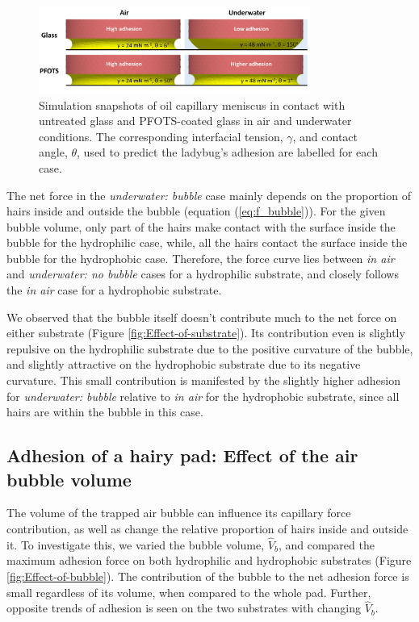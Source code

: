 \documentclass[vruler,JEB]{COB}%
\begin{document}
\begin{figure}
\includegraphics[width=3.5in]{Figure-8-contact_angle_schematic}\caption{\label{fig:Oil-contact-images}Simulation snapshots of oil capillary
meniscus in contact with untreated glass and PFOTS-coated glass in air and underwater conditions.
The corresponding interfacial tension, $\gamma$, and contact
angle, $\theta$, used to predict the ladybug's adhesion
are labelled for each case.}
\end{figure}

The net force in the \emph{underwater: bubble} case mainly depends
on the proportion of hairs inside and outside the bubble (equation
(\ref{eq:f_bubble})). For the given bubble volume, only part of the
hairs make contact with the surface inside the bubble for the hydrophilic case, while,
all the hairs contact the surface inside the bubble for the hydrophobic case.
Therefore, the force curve lies between \emph{in air} and \emph{underwater:
no bubble} cases for a hydrophilic substrate, and closely follows
the \emph{in air} case for a hydrophobic substrate.

We observed that the bubble itself doesn't contribute much to the net force
on either substrate (Figure \ref{fig:Effect-of-substrate}). Its contribution
even is slightly repulsive on the hydrophilic substrate due to the
positive curvature of the bubble, and slightly attractive on the hydrophobic
substrate due to its negative curvature. This small contribution is
manifested by the slightly higher adhesion for \emph{underwater: bubble}
relative to \emph{in air} for the hydrophobic substrate, since all
hairs are within the bubble in this case.

\subsection{Adhesion of a hairy pad: Effect of the air bubble volume}

The volume of the trapped air bubble can influence its capillary force contribution,
as well as change the relative proportion of hairs inside and outside
it. To investigate this, we varied the bubble volume, $\hat{V}_{b}$,
and compared the maximum adhesion force on both hydrophilic and hydrophobic
substrates (Figure \ref{fig:Effect-of-bubble}). The contribution
of the bubble to the net adhesion force is small regardless of its
volume, when compared to the whole pad. Further, opposite trends of
adhesion is seen on the two substrates with changing $\hat{V}_{b}$.
\end{document}
